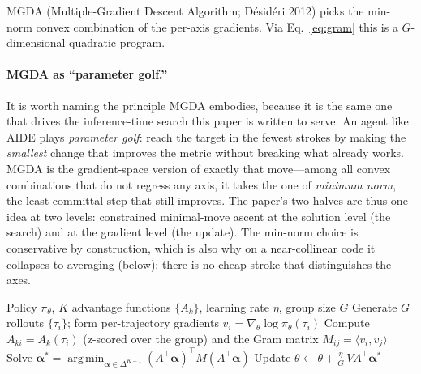 \documentclass[11pt,a4paper]{article}
\newcommand{\argmin}{\operatorname*{arg\,min}}
\begin{document}
MGDA (Multiple-Gradient Descent Algorithm; D\'{e}sid\'{e}ri 2012) picks the
min-norm convex combination of the per-axis gradients.  Via
Eq.~\eqref{eq:gram} this is a $G$-dimensional quadratic program.

\paragraph{MGDA as ``parameter golf.''}
It is worth naming the principle MGDA embodies, because it is the same one
that drives the inference-time search this paper is written to serve.  An
agent like AIDE plays \emph{parameter golf}: reach the target in the fewest
strokes by making the \emph{smallest} change that improves the metric without
breaking what already works.  MGDA is the gradient-space version of exactly
that move---among all convex combinations that do not regress any axis, it
takes the one of \emph{minimum norm}, the least-committal step that still
improves.  The paper's two halves are thus one idea at two levels:
constrained minimal-move ascent at the solution level (the search) and at the
gradient level (the update).  The min-norm choice is conservative by
construction, which is also why on a near-collinear code it collapses to
averaging (below): there is no cheap stroke that distinguishes the axes.

\begin{algorithm}[h]
\caption{MGDA in coefficient space}\label{alg:mgda-vpo}
\begin{algorithmic}[1]
\Require Policy $\pi_\theta$, $K$ advantage functions $\{A_k\}$, learning
  rate $\eta$, group size $G$
  \State Generate $G$ rollouts $\{\tau_i\}$; form per-trajectory gradients
         $v_i = \nabla_\theta \log\pi_\theta(\tau_i)$
  \State Compute $A_{ki} = A_k(\tau_i)$ (z-scored over the group) and the
         Gram matrix $M_{ij}=\langle v_i,v_j\rangle$
  \State Solve $\bm\alpha^* = \argmin_{\bm\alpha\in\Delta^{K-1}}
         (A^\top\bm\alpha)^\top M (A^\top\bm\alpha)$
  \State Update $\theta \gets \theta + \tfrac{\eta}{G}\, V A^\top \bm\alpha^*$
\EndFor
\end{algorithmic}
\end{algorithm}
\end{document}
